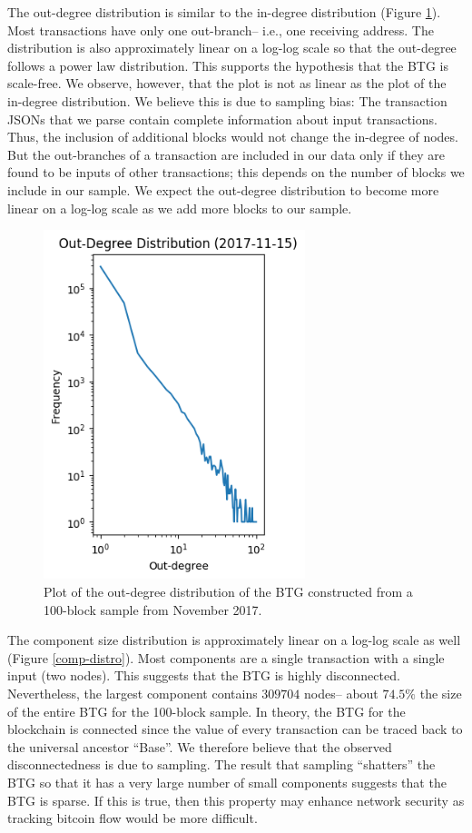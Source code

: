 \documentclass[letterpaper, 10 pt, conference]{ieeeconf}  %
\begin{document}
The out-degree distribution is similar to the in-degree distribution (Figure \ref{out-degree-distro}). Most transactions have only one out-branch-- i.e., one receiving address. The distribution is also approximately linear on a log-log scale so that the out-degree follows a power law distribution. This supports the hypothesis that the BTG is scale-free. We observe, however, that the plot is not as linear as the plot of the in-degree distribution. We believe this is due to sampling bias: The transaction JSONs that we parse contain complete information about input transactions. Thus, the inclusion of additional blocks would not change the in-degree of nodes. But the out-branches of a transaction are included in our data only if they are found to be inputs of other transactions; this depends on the number of blocks we include in our sample. We expect the out-degree distribution to become more linear on a log-log scale as we add more blocks to our sample.

\begin{figure}
\centering
\includegraphics[width=3in]{Plots/Out_degree_distros/2017-11-15.png}
\caption{\label{out-degree-distro} Plot of the out-degree distribution of the BTG constructed from a 100-block sample from November 2017.}
\end{figure}

The component size distribution is approximately linear on a log-log scale as well (Figure \ref{comp-distro}). Most components are a single transaction with a single input (two nodes). This suggests that the BTG is highly disconnected. Nevertheless, the largest component contains $309704$ nodes-- about $74.5\%$ the size of the entire BTG for the 100-block sample. In theory, the BTG for the blockchain is connected since the value of every transaction can be traced back to the universal ancestor ``Base''. We therefore believe that the observed disconnectedness is due to sampling. The result that sampling ``shatters'' the BTG so that it has a very large number of small components suggests that the BTG is sparse. If this is true, then this property may enhance network security as tracking bitcoin flow would be more difficult.
\end{document}
